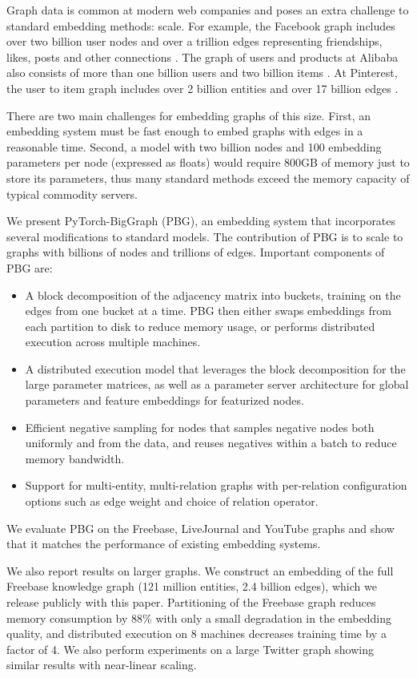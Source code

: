 \documentclass{article}
\begin{document}
Graph data is common at modern web companies and poses an extra challenge to standard embedding methods: scale. For example, the Facebook graph includes over two billion user nodes and over a trillion edges representing friendships, likes, posts and other connections \cite{ching2015one}. The graph of users and products at Alibaba also consists of more than one billion users and two billion items \cite{wang2018billion}. At Pinterest, the user to item graph includes over 2 billion entities and over 17 billion edges \cite{ying2018graph}.

There are two main challenges for embedding graphs of this size. First, an embedding system must be fast enough to embed graphs with  edges in a reasonable time. Second, a model with two billion nodes and 100 embedding parameters per node (expressed as floats) would require 800GB of memory just to store its parameters, thus many standard methods exceed the memory capacity of typical commodity servers.

We present PyTorch-BigGraph (PBG), an embedding system that incorporates several modifications to standard models. The contribution of PBG is to scale to graphs with billions of nodes and trillions of edges. Important components of PBG are:

\begin{itemize}
\item A block decomposition of the adjacency matrix into  buckets, training on the edges from one bucket at a time. PBG then either swaps embeddings from each partition to disk to reduce memory usage, or performs distributed execution across multiple machines.
\item A distributed execution model that leverages the block decomposition for the large parameter matrices, as well as a parameter server architecture for global parameters and feature embeddings for featurized nodes.
\item Efficient negative sampling for nodes that samples negative nodes both uniformly and from the data, and reuses negatives within a batch to reduce memory bandwidth.
\item Support for multi-entity, multi-relation graphs with per-relation configuration options such as edge weight and choice of relation operator.
\end{itemize}

We evaluate PBG on the Freebase, LiveJournal and YouTube graphs and show that it matches the performance of existing embedding systems.

We also report results on larger graphs. We construct an embedding of the full Freebase knowledge graph (121 million entities, 2.4 billion edges), which we release publicly with this paper. Partitioning of the Freebase graph reduces memory consumption by 88\% with only a small degradation in the embedding quality,  and distributed execution on 8 machines decreases training time by a factor of 4. We also perform experiments on a large Twitter graph showing similar results with near-linear scaling.
\end{document}
